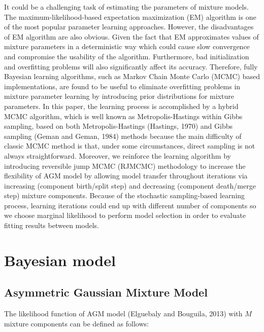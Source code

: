 \documentclass[conference]{IEEEtran}
\begin{document}
It could be a challenging task of estimating the parameters of mixture models. The maximum-likelihood-based expectation maximization (EM) \cite{b3} algorithm is one of the most popular parameter learning approaches. However, the disadvantages of EM algorithm are also obvious. Given the fact that EM approximates values of mixture parameters in a deterministic way which could cause slow convergence and compromise the usability of the algorithm. Furthermore, bad initialization and overfitting problems\cite{b4} \cite{b5} will also significantly affect its accuracy. Therefore, fully Bayesian learning algorithms, such as Markov Chain Monte Carlo (MCMC) based implementations, are found to be useful to eliminate overfitting problems in mixture parameter learning by introducing prior distributions for mixture parameters. In this paper, the learning process is accomplished by a hybrid MCMC algorithm, which is well known as Metropolis-Hastings within Gibbs sampling\cite{b4}, based on both Metropolis-Hastings (Hastings, 1970)\cite{b6} and Gibbs sampling (Geman and Geman, 1984)\cite{b7} methods because the main difficulty of classic MCMC method is that, under some circumstances, direct sampling is not always straightforward. Moreover, we reinforce the learning algorithm by introducing reversible jump MCMC (RJMCMC)\cite{b5} methodology to increase the flexibility of AGM model by allowing model transfer throughout iterations via increasing (component birth/split step) and decreasing (component death/merge step) mixture components. Because of the stochastic sampling-based learning process, learning iterations could end up with different number of components so we choose marginal likelihood\cite{b4} to perform model selection in order to evaluate fitting results between models.



\section{Bayesian model}
\subsection{Asymmetric Gaussian Mixture Model}
The likelihood function of AGM model (Elguebaly and Bouguila, 2013)\cite{b2} with $M$ mixture components can be defined as follows:
\end{document}
